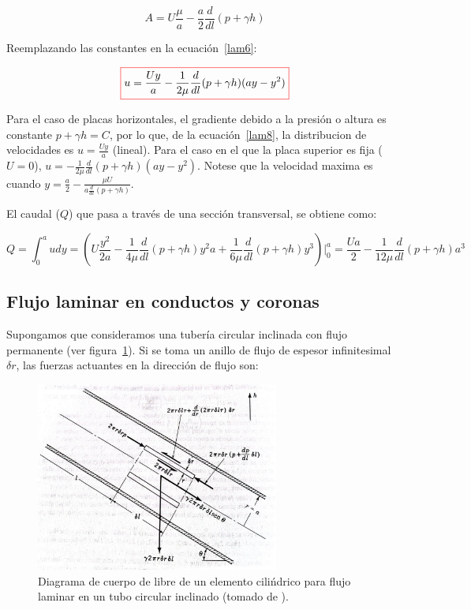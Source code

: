 \documentclass[11pt, oneside]{article}
\begin{document}
\begin{equation}
A = U\frac{\mu}{a} - \frac{a}{2}\frac{d}{dl} (p + \gamma h)
\label{lam7}
\end{equation}

Reemplazando las constantes en la ecuaci\'on~\ref{lam6}:

\begin{equation}
\color{red}\boxed{\color{black} u = \frac{Uy}{a}-\frac{1}{2\mu}\frac{d}{dl}(p + \gamma h)( ay - y^2 ) }
\label{lam8}
\end{equation}

Para el caso de placas horizontales, el gradiente debido a la presi\'on o altura es constante $p+ \gamma h = C$, por lo que, de la ecuaci\'on~\ref{lam8}, la distribucion de velocidades es $u = \frac{Uy}{a}$ (lineal). Para el caso en el que la placa superior es fija ($U=0$), $u = -\frac{1}{2\mu}\frac{d}{dl}(p + \gamma h)( ay - y^2 )$. Notese que la velocidad maxima es cuando $y = \frac{a}{2} - \frac{\mu U}{a \frac{d}{dl}(p + \gamma h)}$. 

El caudal ($Q$) que pasa a trav\'es de una secci\'on transversal, se obtiene como:

\begin{equation}
Q = \int_0^a u dy = \left( U\frac{y^2}{2a} - \frac{1}{4\mu}\frac{d}{dl}(p+ \gamma h) y^2 a + \frac{1}{6\mu}\frac{d}{dl}(p+ \gamma h) y^3 \right) \bigg|_0^a = \frac{Ua}{2} - \frac{1}{12\mu}\frac{d}{dl}(p + \gamma h)a^3
\label{lam8}
\end{equation}

\subsection{Flujo laminar en conductos y coronas} %
Supongamos que consideramos una tuber\'ia circular inclinada con flujo permanente (ver figura~\ref{lamt}). Si se toma un anillo de flujo de espesor infinitesimal $\delta r$, las fuerzas actuantes en la direcci\'on de flujo son:

\begin{figure}[h]
\centering
\includegraphics[width=8cm]{lamt.jpeg}
\caption{Diagrama de cuerpo de libre de un elemento cili\'ndrico para flujo laminar en un tubo circular inclinado (tomado de \cite{streeter}).}
\label{lamt}
\end{figure}
\end{document}
